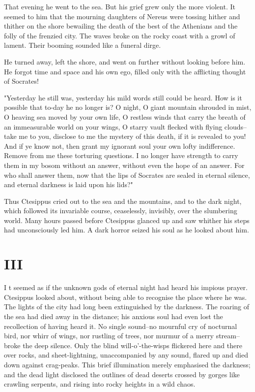 That evening he went to the sea. But his grief grew only the more
violent. It seemed to him that the mourning daughters of Nereus were
tossing hither and thither on the shore bewailing the death of the
best of the Athenians and the folly of the frenzied city. The waves
broke on the rocky coast with a growl of lament. Their booming sounded
like a funeral dirge.

He turned away, left the shore, and went on further without looking
before him. He forgot time and space and his own ego, filled only with
the afflicting thought of Socrates!

"Yesterday he still was, yesterday his mild words still could be
heard. How is it possible that to-day he no longer is? O night, O
giant mountain shrouded in mist, O heaving sea moved by your own life,
O restless winds that carry the breath of an immeasurable world on
your wings, O starry vault flecked with flying clouds--take me to you,
disclose to me the mystery of this death, if it is revealed to you!
And if ye know not, then grant my ignorant soul your own lofty
indifference. Remove from me these torturing questions. I no longer
have strength to carry them in my bosom without an answer, without
even the hope of an answer. For who shall answer them, now that the
lips of Socrates are sealed in eternal silence, and eternal darkness
is laid upon his lids?"

Thus Ctesippus cried out to the sea and the mountains, and to the dark
night, which followed its invariable course, ceaselessly, invisibly,
over the slumbering world. Many hours passed before Ctesippus glanced
up and saw whither his steps had unconsciously led him. A dark horror
seized his soul as he looked about him.



\section{III}


\lettrine[lines=3,lhang=0.11,lraise=0,loversize=0.05]{I}{}%
t seemed as if the unknown gods of eternal night had heard his
impious prayer. Ctesippus looked about, without being able to
recognise the place where he was. The lights of the city had long been
extinguished by the darkness. The roaring of the sea had died away in
the distance; his anxious soul had even lost the recollection of
having heard it. No single sound--no mournful cry of nocturnal bird,
nor whirr of wings, nor rustling of trees, nor murmur of a merry
stream--broke the deep silence. Only the blind will-o'-the-wisps
flickered here and there over rocks, and sheet-lightning,
unaccompanied by any sound, flared up and died down against
crag-peaks. This brief illumination merely emphasised the darkness;
and the dead light disclosed the outlines of dead deserts crossed by
gorges like crawling serpents, and rising into rocky heights in a wild
chaos.

